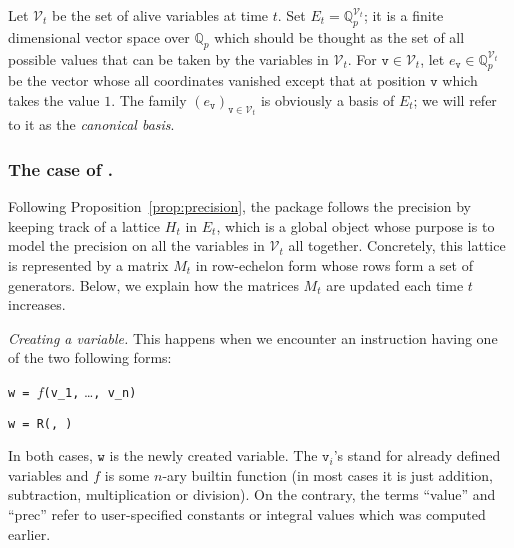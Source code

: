 \documentclass[sigconf]{acmart}
\newcommand{\Q}{\mathbb Q}
\newcommand{\Qp}{\Q_p}
\newcommand{\calV}{\mathcal{V}}
\newcommand{\ttv}{\texttt{v}\xspace}
\newcommand{\ttw}{\texttt{w}\xspace}
\newcommand{\ZpLC}{\text{\rm \tt ZpLC}\xspace}
\theoremstyle{definition}
\begin{document}
Let $\calV_t$ be the set of alive variables at time $t$. Set $E_t = 
\Qp^{\calV_t}$; it is a finite dimensional vector space over $\Qp$ which 
should be thought as the set of all possible values that can be taken by 
the variables in $\calV_t$. For $\ttv \in \calV_t$, let $e_\ttv \in
\Qp^{\calV_t}$ be the vector whose all coordinates vanished except 
that at position $\ttv$ which takes the value $1$. The family 
$(e_\ttv)_{\ttv \in \calV_t}$ is obviously a basis of $E_t$; we will 
refer to it as the \emph{canonical basis}.

\subsubsection{The case of \ZpLC.}

Following Proposition~\ref{prop:precision},
the package \ZpLC follows the precision by keeping track of a lattice
$H_t$ in $E_t$, which is a global object whose purpose is to model the 
precision on all the variables in $\calV_t$ all together.
Concretely, this lattice is represented by a matrix $M_t$ in row-echelon 
form whose rows form a set of generators.
Below, we explain how the matrices $M_t$ are updated each time
$t$ increases.

\smallskip

\noindent \textit{Creating a variable.}
%
This happens when we encounter an instruction having one of the
two following forms:

\medskip

\noindent \hspace{5mm} \makebox[2.5cm]{[Computation]\hfill\null}
\verb?w = ?$f$\verb?(v_1,? \ldots\verb?, v_n)?

\smallskip

\noindent \hspace{5mm} 
\verb?w = ?\verb?R(?\verb?, ?\verb?)?

\medskip

\noindent
In both cases, $\ttw$ is the newly created variable. 
The $\ttv_i$'s stand for already defined variables and $f$ is some 
$n$-ary builtin function (in most cases it is just addition, 
subtraction, multiplication or division). On the contrary, the terms 
``value'' and ``prec'' refer to user-specified constants or integral 
values which was computed earlier.

\smallskip
\end{document}
